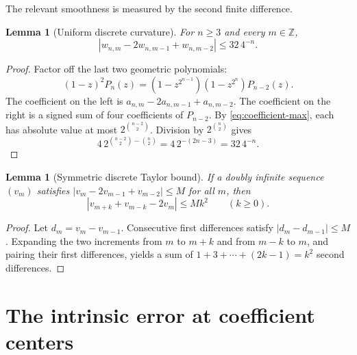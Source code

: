 \documentclass[11pt,oneside]{article}
\newtheorem{lemma}[theorem]{Lemma}
\theoremstyle{definition}
\theoremstyle{remark}
\newcommand{\Z}{\mathbb Z}
\newcommand{\abs}[1]{\left\lvert #1\right\rvert}
\begin{document}
The relevant smoothness is measured by the second finite difference.

\begin{lemma}[Uniform discrete curvature]
\label{lem:discrete-curvature}
For $n\ge3$ and every $m\in\Z$,
\begin{equation}
 \abs{w_{n,m}-2w_{n,m-1}+w_{n,m-2}}
 \le 32\,4^{-n}.                                          \label{eq:curvature-bound}
\end{equation}
\end{lemma}

\begin{proof}
Factor off the last two geometric polynomials:
\begin{equation}
 (1-z)^2P_n(z)
 =(1-z^{2^{n-1}})(1-z^{2^n})P_{n-2}(z).                   \label{eq:second-difference-product}
\end{equation}
The coefficient on the left is
$a_{n,m}-2a_{n,m-1}+a_{n,m-2}$.  The coefficient on the right is a signed sum
of four coefficients of $P_{n-2}$.  By \eqref{eq:coefficient-max}, each has
absolute value at most $2^{\binom{n-2}{2}}$.  Division by
$2^{\binom n2}$ gives
\begin{equation*}
 4\,2^{\binom{n-2}{2}-\binom n2}
 =4\,2^{-(2n-3)}=32\,4^{-n}.
\end{equation*}
\end{proof}

\begin{lemma}[Symmetric discrete Taylor bound]
\label{lem:symmetric-discrete-taylor}
If a doubly infinite sequence $(v_m)$ satisfies
$\abs{v_m-2v_{m-1}+v_{m-2}}\le M$ for all $m$, then
\begin{equation}
 \abs{v_{m+k}+v_{m-k}-2v_m}\le Mk^2
 \qquad(k\ge0).                                           \label{eq:symmetric-second-difference}
\end{equation}
\end{lemma}

\begin{proof}
Let $d_m=v_m-v_{m-1}$.  Consecutive first differences satisfy
$\abs{d_m-d_{m-1}}\le M$.  Expanding the two increments from $m$ to $m+k$ and
from $m-k$ to $m$, and pairing their first differences, yields a sum of
$1+3+\cdots+(2k-1)=k^2$ second differences.
\end{proof}

\section{The intrinsic error at coefficient centers}
\label{sec:center-error}
\end{document}
